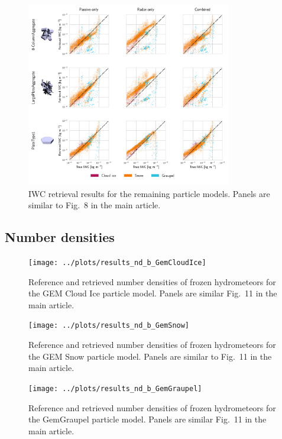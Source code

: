 \documentclass[journal abbreviation, manuscript]{copernicus}
\begin{document}
\begin{figure}[!hbpt]
\centering
\includegraphics[width = 0.8\textwidth]{../plots/results_scatter_b_2}
\caption{IWC retrieval results for the remaining particle models. Panels
  are similar to Fig.~8 in the main article.}
\end{figure}
\clearpage

\subsection{Number densities}

\begin{figure}[!hbpt]
\centering
\texttt{[image: ../plots/results\_nd\_b\_GemCloudIce]}
\caption{Reference and retrieved number densities of frozen hydrometeors for the
  GEM Cloud Ice particle model. Panels are similar Fig.~11 in the main article.}
\end{figure}
\clearpage

\begin{figure}[!hbpt]
\centering
\texttt{[image: ../plots/results\_nd\_b\_GemSnow]}
\caption{Reference and retrieved number densities of frozen hydrometeors for the
  GEM Snow particle model. Panels are similar to Fig.~11 in the main article.}
\end{figure}
\clearpage

\begin{figure}[!hbpt]
\centering
\texttt{[image: ../plots/results\_nd\_b\_GemGraupel]}
\caption{Reference and retrieved number densities of frozen hydrometeors for the
  GemGraupel particle model. Panels are similar Fig.~11 in the main article.}
\end{figure}
\clearpage
\end{document}
